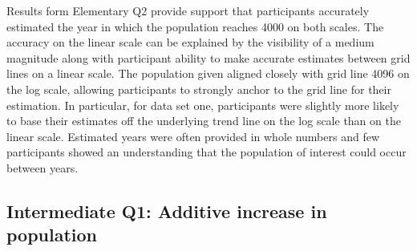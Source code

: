 \documentclass[print]{nuthesis}
\begin{document}
Results form Elementary Q2 provide support that participants accurately estimated the year in which the population reaches 4000 on both scales.
The accuracy on the linear scale can be explained by the visibility of a medium magnitude along with participant ability to make accurate estimates between grid lines on a linear scale.
The population given aligned closely with grid line 4096 on the log scale, allowing participants to strongly anchor to the grid line for their estimation.
In particular, for data set one, participants were slightly more likely to base their estimates off the underlying trend line on the log scale than on the linear scale.
Estimated years were often provided in whole numbers and few participants showed an understanding that the population of interest could occur between years.

\hypertarget{intermediate-q1-additive-increase-in-population}{%
\subsection{Intermediate Q1: Additive increase in population}\label{intermediate-q1-additive-increase-in-population}}
\end{document}
